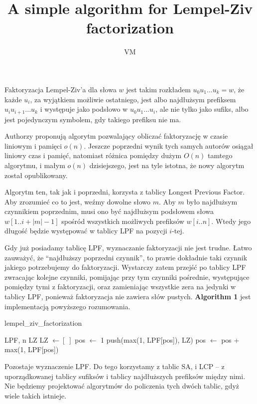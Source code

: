 \documentclass[a4paper,12pt]{article}
\title{A simple algorithm for Lempel-Ziv factorization}
\author{VM}
\theoremstyle{definition}
\begin{document}
\maketitle

Faktoryzacja Lempel-Ziv'a dla słowa $w$ jest takim rozkładem $u_0 u_1 ... u_k = w$,
 że każde $u_i$, za wyjątkiem możliwie ostatniego,
 jest albo najdłużsym prefiksem $u_i u_{i + 1} ... u_k$ i występuje jako podsłowo w $u_0 u_1 ... u_i$,
 ale nie tylko jako sufiks,
 albo jest pojedynczym symbolem, gdy takiego prefiksu nie ma.

Authorzy proponują algorytm pozwalający obliczać faktoryzację w czasie liniowym i pamięci $o(n)$.
Jeszcze poprzedni wynik tych samych autorów osiągał liniowy czas i pamięć,
 natomiast różnica pomiędzy dużym $O(n)$ tamtego algorytmu, i małym $o(n)$ dzisiejszego, jest na tyle istotna,
 że nowy algorytm został opublikowany.

Algorytm ten, tak jak i poprzedni, korzysta z tablicy Longest Previous Factor.
Aby zrozumieć co to jest, weźmy dowolne słowo $m$.
Aby $m$ było najdłużsym czynnikiem poprzednim,
 musi ono być najdłużsym podsłowem słowa $w[1..i + |m| - 1]$ spośród wszystkich możliwych prefiksów $w[i..n]$.
Wtedy jego długość będzie występować w tablicy LPF na pozycji $i$-tej.

Gdy już posiadamy tablicę LPF, wyznaczanie faktoryzacji nie jest trudne.
Łatwo zauważyć, że ``najdłuższy poprzedni czynnik'', to prawie dokładnie taki czynnik jakiego potrzebujemy do faktoryzacji.
Wystarczy zatem przejść po tablicy LPF zwracając kolejne czynniki,
 pomijając przy tym czynniki pośrednie, występujące pomiędzy tymi z faktoryzacji,
 oraz zamieniając wszystkie zera na jedynki w tablicy LPF, ponieważ faktoryzacja nie zawiera słów pustych.
\textbf{Algorithm 1} jest implementacją powyższego rozumowania.

\begin{algorithm}
\caption{lempel\_ziv\_factorization}
\begin{algorithmic}
\REQUIRE LPF, n
\ENSURE LZ
\STATE LZ $\gets [\;]$
\STATE pos $\gets$ 1
\STATE push(max(1, LPF[pos]), LZ)
\STATE pos $\gets$ pos + max(1, LPF[pos])
\ENDWHILE
\end{algorithmic}
\end{algorithm}

Pozostaje wyznaczenie LPF. Do tego korzystamy z tablic SA, i LCP --
 z uporządkowanej tablicy sufiksów i tablicy najdłuższych prefiksów między nimi.
Nie będziemy projektować algorytmów do policzenia tych dwóch tablic,
 gdyż wiele takich istnieje.
\end{document}

